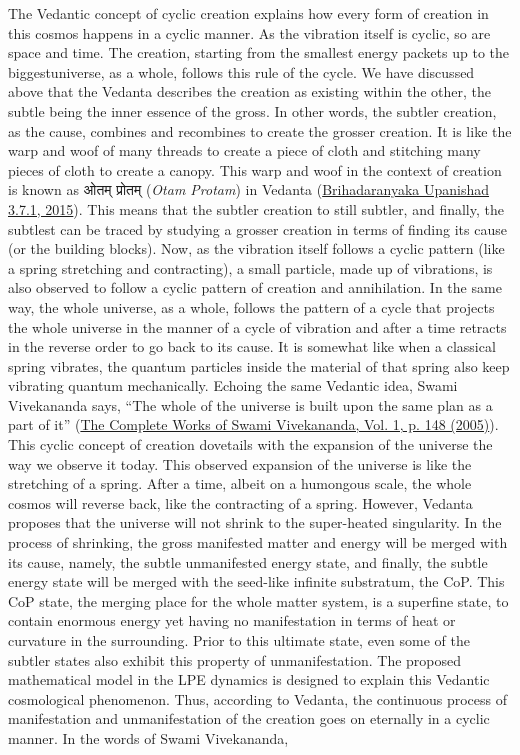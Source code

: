 \documentclass[twoside, 13pt]{article}
\begin{document}
{{\fontsize{12}{14}\selectfont The Vedantic concept of cyclic creation explains how every form of creation in this cosmos happens in a cyclic manner. As the vibration itself is cyclic, so are space and time. The creation, starting from the smallest energy packets up to the biggest\break universe, as a whole, follows this rule of the cycle. We have discussed above that the Vedanta describes the creation as existing within the other, the subtle being the inner essence of the gross. In other words, the subtler creation, as the cause, combines and recombines to create the grosser creation. It is like the warp and woof of many threads to create a piece of cloth and stitching many pieces of cloth to create a canopy. This warp and woof in the context of creation is known as \foreignlanguage{hindi}{{\fontsize{9}{11}\selectfont ओतम् प्रोतम् }}(\textit{Otam Protam}) in Vedanta (\underline{Brihadaranyaka Upanishad 3.7.1, 2015}).  This means that the subtler creation to still subtler, and finally, the subtlest can be traced by studying a grosser creation in terms of finding its cause (or the building blocks). Now, as the vibration itself follows a cyclic pattern (like a spring stretching and contracting), a small particle, made up of vibrations, is also observed to follow a cyclic pattern of creation and annihilation. In the same way, the whole universe, as a whole, follows the pattern of a cycle that projects the whole universe in the manner of a cycle of vibration and after a time retracts in the reverse order to go back to its cause. It is somewhat like when a classical spring vibrates, the quantum particles inside the material of that spring also keep vibrating quantum mechanically. Echoing the same Vedantic idea, Swami Vivekananda says, “The whole of the universe is built upon the same plan as a part of it” (\underline{The Complete Works of Swami Vivekananda, Vol. 1, p. 148 (2005)}). This cyclic concept of creation dovetails with the expansion of the universe the way we observe it today. This observed expansion of the universe is like the stretching of a spring. After a time, albeit on a humongous scale, the whole cosmos will reverse back, like the contracting of a spring. However, Vedanta proposes that the universe will not shrink to the super-heated singularity. In the process of shrinking, the gross manifested matter and energy will be merged with its cause, namely, the subtle unmanifested energy state, and finally, the subtle energy state will be merged with the seed-like infinite substratum, the CoP. This CoP state, the merging place for the whole matter system, is a superfine state, to contain enormous energy yet having no manifestation in terms of heat or curvature in the surrounding. Prior to this ultimate state, even some of the subtler states also exhibit this property of unmanifestation. The proposed mathematical model in the LPE dynamics is designed to explain this Vedantic cosmological phenomenon. Thus, according to Vedanta, the continuous process of manifestation and unmanifestation of the creation goes on eternally in a cyclic manner. In the words of Swami Vivekananda,
}}
\end{document}
